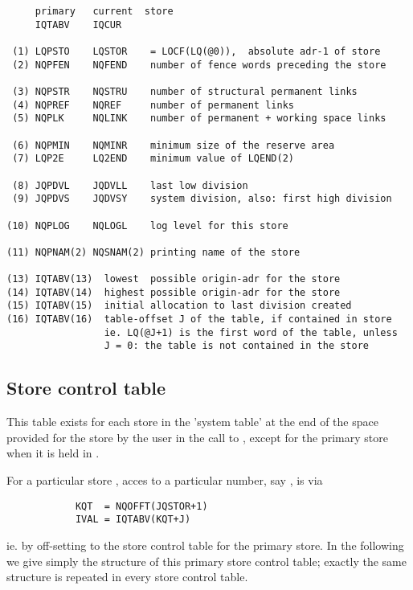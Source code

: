 \begin{verbatim}
     primary   current  store
     IQTABV    IQCUR

 (1) LQPSTO    LQSTOR    = LOCF(LQ(@0)),  absolute adr-1 of store
 (2) NQPFEN    NQFEND    number of fence words preceding the store

 (3) NQPSTR    NQSTRU    number of structural permanent links
 (4) NQPREF    NQREF     number of permanent links
 (5) NQPLK     NQLINK    number of permanent + working space links

 (6) NQPMIN    NQMINR    minimum size of the reserve area
 (7) LQP2E     LQ2END    minimum value of LQEND(2)

 (8) JQPDVL    JQDVLL    last low division
 (9) JQPDVS    JQDVSY    system division, also: first high division

(10) NQPLOG    NQLOGL    log level for this store

(11) NQPNAM(2) NQSNAM(2) printing name of the store

(13) IQTABV(13)  lowest  possible origin-adr for the store
(14) IQTABV(14)  highest possible origin-adr for the store
(15) IQTABV(15)  initial allocation to last division created
(16) IQTABV(16)  table-offset J of the table, if contained in store
                 ie. LQ(@J+1) is the first word of the table, unless
                 J = 0: the table is not contained in the store
\end{verbatim} 

\subsection*{Store control table}

This table exists for each store in the 'system table'
at the end of the space
provided for the store by the user in the call to ,
except for the primary store when it is held in .

For a particular store , acces to a particular number,
say , is via
\begin{verbatim}
            KQT  = NQOFFT(JQSTOR+1)
            IVAL = IQTABV(KQT+J)
\end{verbatim} 
ie. by off-setting to the store control table for the primary store.
In the following we give simply the structure of this primary
store control table; exactly the same structure is repeated in every
store control table.

